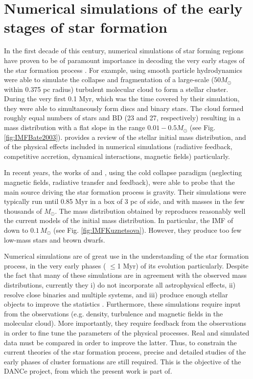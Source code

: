 \section{Numerical simulations of the early stages of star formation}
\label{sect:numerical_simulations}

In the first decade of this century, numerical simulations of star forming regions have proven to be of paramount importance in decoding the very early stages of the star formation process \cite[e.g][]{2003MNRAS.339..577B,2005A&A...435..611J,2009MNRAS.392..590B,2009MNRAS.392.1363B,2009MNRAS.397..232B}. For example, \citet{2003MNRAS.339..577B} using smooth particle hydrodynamics were able to simulate the collapse and fragmentation of a large-scale ($50 M_{\odot}$ within 0.375 pc radius) turbulent molecular cloud to form a stellar cluster. During the very first 0.1 Myr, which was the time covered by their simulation, they were able to simultaneously form discs and binary stars. The cloud formed roughly equal numbers of stars and BD (23 and 27, respectively) resulting in a mass distribution with a flat slope in the range $0.01-0.5 M_{\odot}$ (see Fig. \ref{fig:IMFBate2003}). \citet{Offner2014} provides a review of the stellar initial mass distribution, and of the physical effects included in numerical simulations (radiative feedback, competitive accretion, dynamical interactions, magnetic fields) particularly. 

In recent years, the works of \citet{2015ApJ...815...27K} and \citet{2015MNRAS.452..566B}, using the cold collapse paradigm (neglecting magnetic fields, radiative transfer and feedback), were able to probe that the main source driving the star formation process is gravity. Their simulations were typically run until 0.85 Myr in a box of 3 pc of side, and with masses in the few thousands of $M_{\odot}$. The mass distribution obtained by \citet{2015ApJ...815...27K} reproduces reasonably well the current models of the initial mass distribution. In particular, the IMF of \citet{Chabrier2005} down to  $0.1\,M_{\odot}$ (see Fig. \ref{fig:IMFKuznetsova}). However, they produce too few low-mass stars and brown dwarfs.


Numerical simulations are of great use in the understanding of the star formation process, in the very early phases ( $\leq$1 Myr) of its evolution particularly.  Despite the fact that many of these simulations are in agreement with the observed mass distributions, currently they i) do not incorporate all astrophysical effects, ii) resolve close binaries and multiple systems, and iii) produce enough stellar objects to improve the statistics \citep{Offner2014}. Furthermore, these simulations require input from the observations (e.g. density, turbulence and magnetic fields in the molecular cloud). More importantly, they require feedback from the observations in order to fine tune the parameters of the physical processes. Real and simulated data must be compared in order to improve the latter. Thus, to constrain the current theories of the star formation process, precise and detailed studies of the early phases of cluster formations are still required. This is the objective of the DANCe project, from which the present work is part of.



